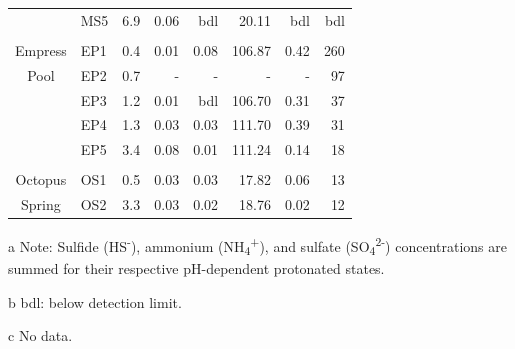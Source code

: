 {\begin{table}[htbp]
\begin{adjustbox}{width=\textwidth,keepaspectratio}
\begin{threeparttable}
\begin{tabular}{clrrrrrr}
      & MS5   & 6.9   & 0.06  & bdl   & 20.11 & bdl   & bdl \\
      &       &       &       &       &       &       &  \\
Empress & EP1   & 0.4   & 0.01  & 0.08  & 106.87 & 0.42  & 260 \\
Pool  & EP2   & 0.7   & -\tnote{c} & -     & -     & -     & 97 \\
      & EP3   & 1.2   & 0.01  & bdl   & 106.70 & 0.31  & 37 \\
      & EP4   & 1.3   & 0.03  & 0.03  & 111.70 & 0.39  & 31 \\
      & EP5   & 3.4   & 0.08  & 0.01  & 111.24 & 0.14  & 18 \\
      &       &       &       &       &       &       &  \\
Octopus & OS1   & 0.5   & 0.03  & 0.03  & 17.82 & 0.06  & 13 \\
Spring & OS2   & 3.3   & 0.03  & 0.02  & 18.76 & 0.02  & 12 \\
\bottomrule
\end{tabular}%



	\begin{tablenotes}
      \small
      \item[a] Note: Sulfide (HS\textsuperscript{-}), ammonium (NH\textsubscript{4}\textsuperscript{+}), and sulfate (SO\textsubscript{4}\textsuperscript{2-}) concentrations are summed for their respective pH-dependent protonated states.
      
      \item[b] bdl: below detection limit.
      
      \item[c] No data.
      \normalsize
    \end{tablenotes}
  \label{tab:redox}%
  \end{threeparttable}
  \end{adjustbox}
\end{table}%
\doublespace
\clearpage
}


